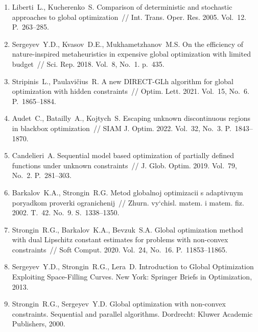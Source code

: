 \documentclass[a4paper,12pt,russian]{article}
\begin{document}
\begin{enumerate}
\item \label{rfa:enlit:Liberti2005}
Liberti~L., Kucherenko~S. Comparison of deterministic and stochastic approaches to global optimization~// Int. Trans. Oper. Res. 2005. Vol.~12. P.~263--285.

\item \label{rfa:enlit:Sergeyev2018}
Sergeyev~Y.D., Kvasov~D.E., Mukhametzhanov~M.S. On the efficiency of nature-inspired metaheuristics in expensive global optimization with limited budget~// Sci. Rep. 2018. Vol.~8, No.~1. p.~435.

\item \label{rfa:enlit:Stripinis2021}
Stripinis~L., Paulavi{\v c}ius~R. A new {DIRECT}-{GLh} algorithm for global optimization with hidden constraints~// Optim. Lett. 2021. Vol.~15, No.~6. P.~1865--1884.

\item \label{rfa:enlit:Audet2022}
Audet~C., Batailly~A., Kojtych~S. Escaping unknown discontinuous regions in blackbox optimization~// SIAM J. Optim. 2022. Vol.~32, No.~3. P.~1843--1870. %

\item \label{rfa:enlit:Candelieri2019}
Candelieri~A. Sequential model based optimization of partially defined functions
under unknown constraints~// J. Glob. Optim. 2019. Vol.~79, No.~2. P.~281--303. %

\item \label{rfa:enlit:Sergeyev2003}
Barkalov~K.A., Strongin~R.G. Metod globalnoj optimizacii s adaptivnym poryadkom proverki ogranichenij~// Zhurn. vy`chisl. matem. i matem. fiz. 2002. T.~42. No.~9. S.~1338--1350.

\item \label{rfa:enlit:Strongin2020}
Strongin~R.G., Barkalov~K.A., Bevzuk~S.A. Global optimization method with dual Lip\-schitz constant estimates for problems with non-convex constraints~// 
Soft Comput. 2020. Vol.~24, No.~16. P.~11853--11865. %



\item \label{rfa:enlit:Sergeyev2013}
Sergeyev~Y.D., Strongin~R.G., Lera~D. Introduction to Global Optimization Exploiting Space-Filling Curves. New York: Springer Briefs in Optimization, 2013. %

\item \label{rfa:enlit:Strongin2000}
Strongin~R.G., Sergeyev~Y.D. Global optimization with non-convex constraints. Sequential and parallel algorithms. Dordrecht: Kluwer Academic Publishers, 2000.


\end{enumerate}
\end{document}
